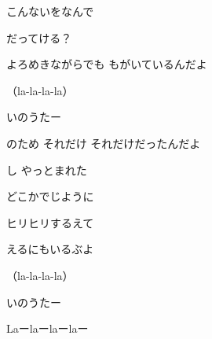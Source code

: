 \documentclass[a4paper,tate,twocolumn,12pt]{ltjtarticle}
\begin{document}
\begin{flushleft}
\begin{minipage}{\linewidth}
こんないをなんで

だってける？

よろめきながらでも もがいているんだよ

（la-la-la-la）

いのうたー
\end{minipage}

\vspace{2em}

\noindent\begin{minipage}{\linewidth}
のため それだけ それだけだったんだよ

し やっとまれた
\end{minipage}

\vspace{2em}

\noindent\begin{minipage}{\linewidth}
どこかでじように

ヒリヒリするえて

えるにもいるぶよ

（la-la-la-la）

いのうたー
\end{minipage}

\vspace{2em}

\noindent\begin{minipage}{\linewidth}
Laーlaーlaーlaー
\end{minipage}

\end{flushleft}
\end{document}
